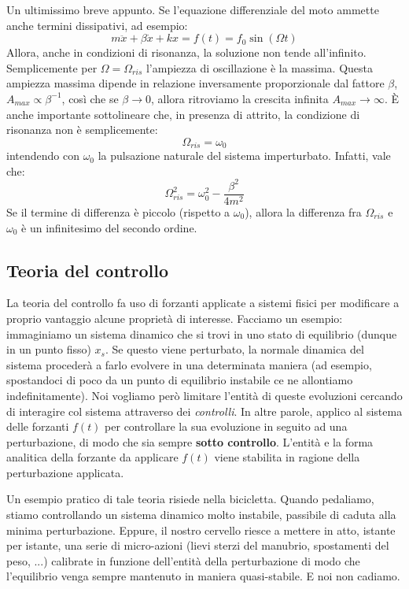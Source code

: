 \documentclass[a4paper,openany]{article}
\begin{document}
	Un ultimissimo breve appunto. Se l'equazione differenziale del moto ammette anche termini dissipativi, ad esempio:
	\begin{equation}\label{key}
		m\ddot{x} + \beta \dot{x} + kx = f(t) = f_0 \sin(\Omega t)
	\end{equation}
	Allora, anche in condizioni di risonanza, la soluzione non tende all'infinito. Semplicemente per $\Omega = \Omega_{ris}$ l'ampiezza di oscillazione è la massima. Questa ampiezza massima dipende in relazione inversamente proporzionale dal fattore $\beta$, $A_{max} \propto \beta^{-1}$, così che se $\beta\to0$, allora ritroviamo la crescita infinita $A_{max}\to \infty$. È anche importante sottolineare che, in presenza di attrito, la condizione di risonanza non è semplicemente:
	\begin{equation}\label{key}
		\Omega_{ris} = \omega_0
	\end{equation}
	intendendo con $\omega_0$ la pulsazione naturale del sistema imperturbato. Infatti, vale che:
	\begin{equation}\label{key}
		\Omega_{ris}^{2} = \omega_{0}^2 - \dfrac{\beta^{2}}{4m^{2}}
	\end{equation}
	Se il termine di differenza è piccolo (rispetto a $\omega_0$), allora la differenza fra $\Omega_{ris}$ e $\omega_{0}$ è un infinitesimo del secondo ordine.
	\newpage
	\subsection{Teoria del controllo}
	La teoria del controllo fa uso di forzanti applicate a sistemi fisici per modificare a proprio vantaggio alcune proprietà di interesse. Facciamo un esempio: immaginiamo un sistema dinamico che si trovi in uno stato di equilibrio (dunque in un punto fisso) $x_{s}$. Se questo viene perturbato, la normale dinamica del sistema procederà a farlo evolvere in una determinata maniera (ad esempio, spostandoci di poco da un punto di equilibrio instabile ce ne allontiamo indefinitamente). Noi vogliamo però limitare l'entità di queste evoluzioni cercando di interagire col sistema attraverso dei \textit{controlli}. In altre parole, applico al sistema delle forzanti $f(t)$ per controllare la sua evoluzione in seguito ad una perturbazione, di modo che sia sempre \textbf{sotto controllo}. L'entità e la forma analitica della forzante da applicare $f(t)$ viene stabilita in ragione della perturbazione applicata.
	
	
	Un esempio pratico di tale teoria risiede nella bicicletta. Quando pedaliamo, stiamo controllando un sistema dinamico molto instabile, passibile di caduta alla minima perturbazione. Eppure, il nostro cervello riesce a mettere in atto, istante per istante, una serie di micro-azioni (lievi sterzi del manubrio, spostamenti del peso, ...) calibrate in funzione dell'entità della perturbazione di modo che l'equilibrio venga sempre mantenuto in maniera quasi-stabile. E noi non cadiamo.
	
\end{document}
